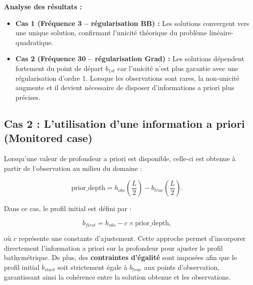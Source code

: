 \documentclass{article}
\begin{document}
\noindent\textbf{Analyse des résultats :}\

\begin{itemize}
    \item \textbf{Cas 1 (Fréquence 3 – régularisation BB) :}  
    Les solutions convergent vers une unique solution, confirmant l’unicité théorique du problème linéaire-quadratique. \newline

    \item \textbf{Cas 2 (Fréquence 30 – régularisation Grad) :}  
    Les solutions dépendent fortement du point de départ \( b_{1st} \) car l’unicité n’est plus garantie avec une régularisation d’ordre 1. Lorsque les observations sont rares, la non-unicité augmente et il devient nécessaire de disposer d’informations a priori plus précises.
\end{itemize}




\subsection{Cas 2 : L'utilisation d'une information a priori (Monitored case)}

Lorsqu'une valeur de profondeur a priori est disponible, celle-ci est obtenue à partir de l'observation au milieu du domaine :



\[
\text{prior\_depth} = h_{obs}\left(\frac{L}{2}\right) - b_{true}\left(\frac{L}{2}\right).
\]



Dans ce cas, le profil initial est défini par :



\[
b_{first} = h_{obs} - c \times \text{prior\_depth},
\]



où \( c \) représente une constante d'ajustement. Cette approche permet d'incorporer directement l'information a priori sur la profondeur pour ajuster le profil bathymétrique. De plus, des \textbf{contraintes d'égalité} sont imposées afin que le profil initial \( b_{start} \) soit strictement égale à \( b_{true} \) aux points d'observation, garantissant ainsi la cohérence entre la solution obtenue et les observations.
\end{document}
